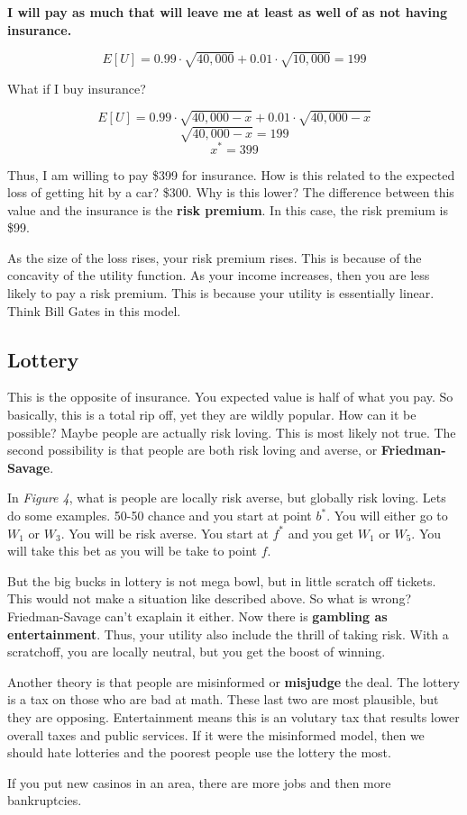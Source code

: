 \documentclass{article}
\begin{document}
\textbf{I will pay as much that will leave me at least as well of as not having
insurance.}

$$E[U] = 0.99 \cdot \sqrt{40,000} + 0.01 \cdot \sqrt{10,000} = 199$$

What if I buy insurance?

$$E[U] = 0.99 \cdot \sqrt{40,000 - x} + 0.01 \cdot \sqrt{40,000 - x}$$
$$\sqrt{40,000 - x} = 199$$
$$x^* = 399$$

Thus, I am willing to pay \$399 for insurance. How is this related to the
expected loss of getting hit by a car? \$300. Why is this lower? The difference
between this value and the insurance is the \textbf{risk premium}. In this case,
the risk premium is \$99. 

As the size of the loss rises, your risk premium rises. This is because of the
concavity of the utility function. As your income increases, then you are less
likely to pay a risk premium. This is because your utility is essentially
linear. Think Bill Gates in this model.

\subsection{Lottery}

This is the opposite of insurance. You expected value is half of what you pay.
So basically, this is a total rip off, yet they are wildly popular. How can it
be possible? Maybe people are actually risk loving. This is most likely not
true. The second possibility is that people are both risk loving and averse, or
\textbf{Friedman-Savage}.

In \textit{Figure 4}, what is people are locally risk averse, but globally risk
loving. Lets do some examples. 50-50 chance and you start at point $b^*$. You
will either go to $W_1$ or $W_3$. You will be risk averse. You start at $f^*$
and you get $W_1$ or $W_5$. You will take this bet as you will be take to point
$f$.

But the big bucks in lottery is not mega bowl, but in little scratch off
tickets. This would not make a situation like described above. So what is wrong?
Friedman-Savage can't exaplain it either. Now there is \textbf{gambling as
entertainment}. Thus, your utility also include the thrill of taking risk. With
a scratchoff, you are locally neutral, but you get the boost of winning.

Another theory is that people are misinformed or \textbf{misjudge} the deal. The
lottery is a tax on those who are bad at math. These last two are most
plausible, but they are opposing. Entertainment means this is an volutary tax
that results lower overall taxes and public services. If it were the misinformed
model, then we should hate lotteries and the poorest people use the lottery the
most. 

If you put new casinos in an area, there are more jobs and then more
bankruptcies.
\end{document}
